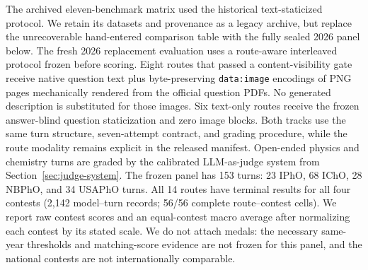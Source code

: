 \documentclass[11pt]{article}
\begin{document}
The archived eleven-benchmark matrix used the historical text-staticized protocol. We retain its datasets and provenance as a legacy archive, but replace the unrecoverable hand-entered comparison table with the fully sealed 2026 panel below.
The fresh 2026 replacement evaluation uses a route-aware interleaved protocol frozen before scoring.
Eight routes that passed a content-visibility gate receive native question text plus byte-preserving \texttt{data:image} encodings of PNG pages mechanically rendered from the official question PDFs.
No generated description is substituted for those images.
Six text-only routes receive the frozen answer-blind question staticization and zero image blocks.
Both tracks use the same turn structure, seven-attempt contract, and grading procedure, while the route modality remains explicit in the released manifest.
Open-ended physics and chemistry turns are graded by the calibrated LLM-as-judge system from Section~\ref{sec:judge-system}.
The frozen panel has 153 turns: 23 IPhO, 68 IChO, 28 NBPhO, and 34 USAPhO turns. All 14 routes have terminal results for all four contests (2,142 model--turn records; 56/56 complete route--contest cells). We report raw contest scores and an equal-contest macro average after normalizing each contest by its stated scale. We do not attach medals: the necessary same-year thresholds and matching-score evidence are not frozen for this panel, and the national contests are not internationally comparable.
\end{document}
